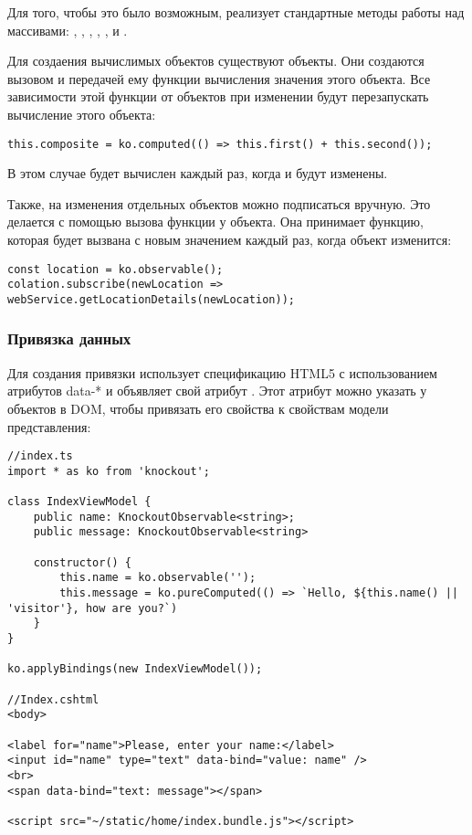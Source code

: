 \documentclass[a4paper,14pt]{extarticle}
\begin{document}
Для того, чтобы это было возможным,  реализует стандартные
методы работы над массивами: , , ,
, ,  и .

Для создаения вычислимых объектов существуют  объекты. Они создаются вызовом
 и передачей ему функции вычисления значения этого объекта. Все зависимости
этой функции от объектов  при изменении будут перезапускать вычисление
этого объекта:

\begin{lstlisting}
this.composite = ko.computed(() => this.first() + this.second());
\end{lstlisting}

В этом случае  будет вычислен каждый раз, когда  и 
будут изменены.

Также, на изменения отдельных объектов можно подписаться вручную. Это делается с помощью вызова
функции  у  объекта. Она принимает функцию, которая будет вызвана
с новым значением каждый раз, когда  объект изменится:

\begin{lstlisting}
const location = ko.observable();
colation.subscribe(newLocation => webService.getLocationDetails(newLocation));
\end{lstlisting}

\subsubsection{Привязка данных}
Для создания привязки  использует спецификацию HTML5 с использованием атрибутов data-*
и объявляет свой атрибут . Этот атрибут можно указать у объектов в DOM, чтобы привязать
его свойства к свойствам модели представления:

\begin{lstlisting}
//index.ts
import * as ko from 'knockout';

class IndexViewModel {
    public name: KnockoutObservable<string>;
    public message: KnockoutObservable<string>

    constructor() {
        this.name = ko.observable('');
        this.message = ko.pureComputed(() => `Hello, ${this.name() || 'visitor'}, how are you?`)
    }
}

ko.applyBindings(new IndexViewModel());

//Index.cshtml
<body>

<label for="name">Please, enter your name:</label>
<input id="name" type="text" data-bind="value: name" />
<br>
<span data-bind="text: message"></span>

<script src="~/static/home/index.bundle.js"></script>
\end{lstlisting}
\end{document}
